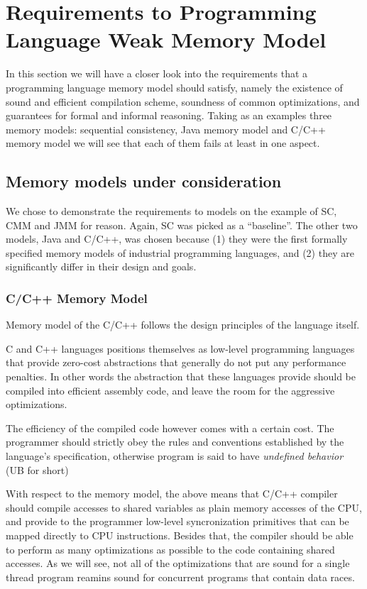 \documentclass[a4paper,twoside,11pt]{article}
\numberwithin{equation}{section}
\begin{document}



\section{Requirements to Programming Language Weak Memory Model}

In this section we will have a closer look into the requirements 
that a programming language memory model should satisfy, 
namely the existence of sound and efficient compilation scheme, 
soundness of common optimizations, and guarantees for formal and informal reasoning.  
Taking as an examples three memory models: 
sequential consistency, Java memory model and C/C++ memory model
we will see that each of them fails at least in one aspect.

\subsection{Memory models under consideration}

We chose to demonstrate the requirements to models on the example of SC, CMM and JMM for reason.
Again, SC was picked as a ``baseline''.
The other two models, Java and C/C++, was chosen because 
(1) they were the first formally specified memory models of industrial programming languages, and
(2) they are significantly differ in their design and goals.

\subsubsection{C/C++ Memory Model}

Memory model of the C/C++ follows the design principles of the language itself.

C and C++ languages positions themselves as low-level programming languages
that provide zero-cost abstractions that generally do not put any performance penalties. 
In other words the abstraction that these languages provide 
should be compiled into efficient assembly code,
and leave the room for the aggressive optimizations.

The efficiency of the compiled code however comes with a certain cost.
The programmer should strictly obey the rules and conventions
established by the language's specification, 
otherwise program is said to have \emph{undefined behavior} (UB for short)

With respect to the memory model, the above means that C/C++ compiler should
compile accesses to shared variables as plain memory accesses of the CPU,
and provide to the programmer low-level syncronization primitives
that can be mapped directly to CPU instructions.
Besides that, the compiler should be able to perform 
as many optimizations as possible to the code containing shared accesses.
As we will see, not all of the optimizations that are sound 
for a single thread program reamins sound for concurrent programs that contain data races. 
\end{document}
